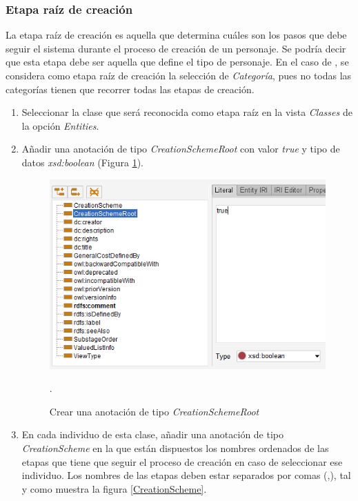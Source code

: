 \subsubsection{Etapa raíz de creación}
La etapa raíz de creación es aquella que determina cuáles son los pasos que debe seguir el sistema durante el proceso 
de creación de un personaje. Se podría decir que esta etapa debe ser aquella que define el tipo de personaje. En el 
caso de \anima, se considera como etapa raíz de creación la selección de \textit{Categoría}, pues no todas las categorías 
tienen que recorrer todas las etapas de creación. \medskip

\begin{enumerate}
    \item Seleccionar la clase que será reconocida como etapa raíz en la vista \textit{Classes} de la opción \textit{Entities}.
    \item Añadir una anotación de tipo \textit{CreationSchemeRoot} con valor \textit{true} y tipo de datos 
    \textit{xsd:boolean} (Figura \ref*{CreationSchemeRoot}).

    \begin{figure}[H]
        \centering
        \includegraphics[scale=0.6]{Figures/Protege/CreationSchemeRoot.png}
        \caption{Crear una anotación de tipo \textit{CreationSchemeRoot}}.
        \label{CreationSchemeRoot}
    \end{figure}

    \item En cada individuo de esta clase, añadir una anotación de tipo \textit{CreationScheme} en la que 
    están dispuestos los nombres ordenados de las etapas que tiene que seguir el proceso de creación en caso de 
    seleccionar ese individuo. Los nombres de las etapas deben estar separados por comas (,), tal y como muestra 
    la figura \ref*{CreationScheme}.


\end{enumerate}
